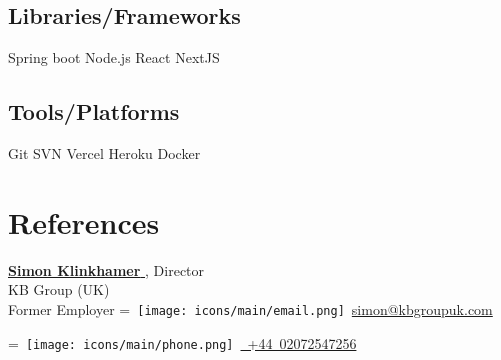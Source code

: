 \documentclass[]{plushcv}
\begin{document}
\begin{minipage}[t]{0.34\textwidth}
\subsection{Libraries/Frameworks}
\sectionsep
Spring boot \textbullet{} Node.js \textbullet{} React \textbullet{} NextJS \\
\sectionsep
\subsection{Tools/Platforms}
\sectionsep
Git \textbullet{} SVN \textbullet{} Vercel \textbullet{} Heroku \textbullet{} Docker \\
\sectionsep


\sectionsep



\section{References} 
\href{http://www.kbgroupuk.com/meettheteam.asp}{\textbf{Simon Klinkhamer }}, Director 
\\KB Group (UK)\\
\textbullet{} Former Employer
\begingroup
{}=\hbox{
\texttt{[image: icons/main/email.png]}\hspace{0.3cm} \href{mailto:simon@kbgroupuk.com}{simon@kbgroupuk.com}
}
\parbox{\wd0}{}
\endgroup
\begingroup
{}=\hbox{
\texttt{[image: icons/main/phone.png]}\hspace{0.3cm}
\href{tel: +4402072547256}{ +44 02072547256}
}



\end{minipage}
\end{document}
